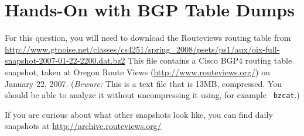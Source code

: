 \documentclass[11pt]{article}
\begin{document}
\section{Hands-On with BGP Table Dumps}

For this question, you will need to download the Routeviews routing
table from
\url{http://www.gtnoise.net/classes/cs4251/spring_2008/psets/ps1/aux/oix-full-snapshot-2007-01-22-2200.dat.bz2}
This file contains a Cisco BGP4 routing table snapshot, taken at Oregon
Route Views (\url{http://www.routeviews.org/}) on January 22,
2007. ({\em Beware:} This is a text file that is 13MB, compressed.  You should
be able to analyze it without uncompressing it using, for example {\tt
bzcat}.)

If you are curious about what other snapshots look like, you
can find daily snapshots at \url{http://archive.routeviews.org/}
\end{document}
